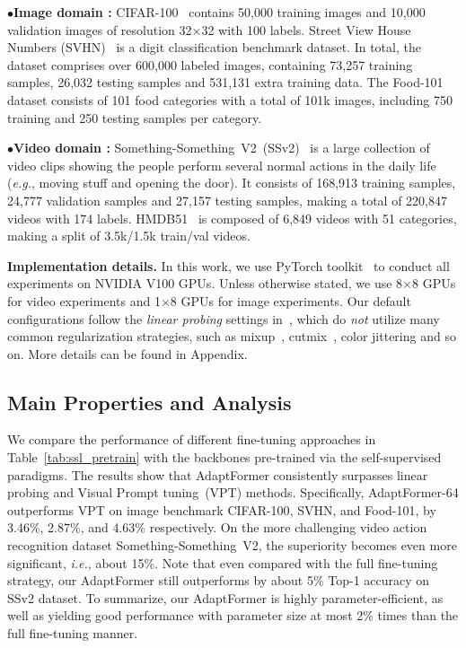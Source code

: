 \textcolor{Image}{\textbf{$\bullet$\quad Image domain :}} CIFAR-100~\cite{krizhevsky-2009-cifar} contains 50,000 training images and 10,000 validation images of resolution 32×32 with 100 labels. Street View House Numbers (SVHN)~\cite{goodfellow-2013-svhn} is a digit classification benchmark dataset. In total, the dataset comprises over 600,000 labeled images, containing 73,257 training samples, 26,032 testing samples and 531,131 extra training data. The Food-101~\cite{bossard-eccv14-food101} dataset consists of 101 food categories with a total of 101k images, including 750 training and 250 testing samples per category.

\textcolor{Video}{\textbf{$\bullet$\quad Video domain :}} Something-Something~V2~(SSv2)~\cite{goyal-iccv17-sthsthv2} is a large collection of video clips showing the people perform several normal actions in the daily life (\emph{e.g.}, moving stuff and opening the door). It consists of 168,913 training samples, 24,777 validation samples and 27,157 testing samples, making a total of 220,847 videos with 174 labels. HMDB51~\cite{kuehne-iccv11-hmdb} is composed of 6,849 videos with 51 categories, making a split of 3.5k/1.5k train/val videos.

\textbf{Implementation details.} In this work, we use PyTorch toolkit~\cite{NEURIPS2019_9015} to conduct all experiments on NVIDIA V100 GPUs. Unless otherwise stated, we use 8$\times$8 GPUs for video experiments and 1$\times$8 GPUs for image experiments. Our default configurations follow the \emph{linear probing} settings in~\cite{chen-iccv21-mocov3,he-2021-mae}, which do \emph{not} utilize many common regularization strategies, such as mixup~\cite{zhang-2017-mixup}, cutmix~\cite{yun-iccv19-cutmix}, color jittering and so on. More details can be found in Appendix.

\subsection{Main Properties and Analysis}\label{sec:main_results}

We compare the performance of different fine-tuning approaches in Table~\ref{tab:ssl_pretrain} with the backbones pre-trained via the self-supervised paradigms. The results show that AdaptFormer consistently surpasses linear probing and Visual Prompt tuning~(VPT) methods. Specifically, AdaptFormer-64 outperforms VPT on image benchmark \textcolor{Image}{CIFAR-100}, \textcolor{Image}{SVHN}, and \textcolor{Image}{Food-101}, by 3.46\%, 2.87\%, and 4.63\% respectively. On the more challenging video action recognition dataset \textcolor{Video}{Something-Something~V2}, the superiority becomes even more significant, \emph{i.e.}, about 15\%. Note that even compared with the full fine-tuning strategy, our AdaptFormer still outperforms by about 5\% Top-1 accuracy on \textcolor{Video}{SSv2} dataset. To summarize, our AdaptFormer is highly parameter-efficient, as well as yielding good performance with parameter size at most 2\% times than the full fine-tuning manner.

